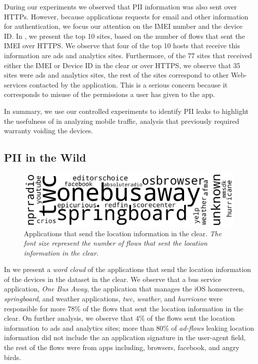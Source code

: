 During our experiments we observed that PII information was also sent over HTTPs. 
However, because applications requests for email and other information for authentication, we focus our attention on the IMEI number and the device ID.
In , we present the top 10 sites, based on the number of flows that sent the IMEI over HTTPS. 
We observe that four of the top 10 hosts that receive this information are ads and analytics sites.
Furthermore, of the 77 sites that received either the IMEI or Device ID in the clear or over HTTPS, we observe that 35 sites were ads and analytics sites, the rest of the sites correspond to other Web-services contacted by the application. 
This is a serious concern because it corresponds to misuse of the permissions a user has given to the app.

In summary, we use our controlled experiments to identify PII leaks to highlight the usefulness of \platname in analyzing mobile traffic, analysis that previously required warranty voiding the devices.


\subsection{PII in the Wild}

\begin{figure} 
\includegraphics[width=\columnwidth]{figures/wordcloud_useragentsignature_location_image.png}
\caption{Applications that send the location information in the clear. \emph{The font size represent the number of flows that sent the location information in the clear.}}
\label{fig:location-wordcloud}
\end{figure}

In  we present a \emph{word cloud} of the applications that send the location information of the devices in the \mobWild dataset in the clear. 
We observe that a bus service application, \emph{One Bus Away}, the application that manages the iOS homescreen, \emph{springboard}, and  weather applications, \emph{twc}, \emph{weather}, and \emph{hurricane} were responsible for more 78\% of the flows that sent the location information in the clear. 
On further analysis, we observe that 4\% of the flows sent the location information to ads and analytics sites; more than 80\% of \emph{ad-flows} leaking location information did not include the an application signature in the user-agent field, the rest of the flows were from apps including, browsers, facebook, and angry birds.

